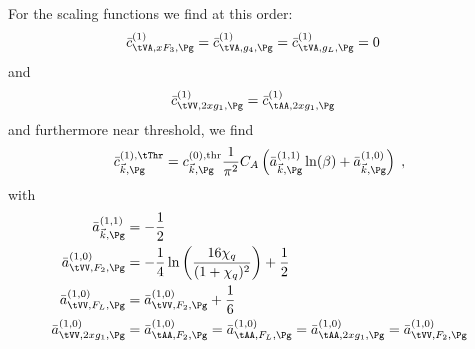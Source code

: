 For the scaling functions we find at this order:
\begin{align}
\bar c_{\tVA,xF_3,\Pg}^{(1)} &= \bar c_{\tVA,g_4,\Pg}^{(1)} = \bar c_{\tVA,g_L,\Pg}^{(1)} = 0
\end{align}
and 
\begin{align}
\bar c_{\tVV,2xg_1,\Pg}^{(1)} &= \bar c_{\tAA,2xg_1,\Pg}^{(1)}
\end{align}
and furthermore  near threshold, we find
\begin{equation}
\bar c_{\vec k,\Pg}^{(1),\tThr} = c_{\vec k,\Pg}^{(0),\text{thr}} \frac{1}{\pi^2}
     C_A\left(\bar a_{\vec k,\Pg}^{(1,1)}\ln(\beta) + \bar a_{\vec k,\Pg}^{(1,0)}\right)\;,
\end{equation} 
with
\begin{align}
\bar a^{(1,1)}_{\vec k,\Pg} &= -\frac 1 2\\
\bar a^{(1,0)}_{\tVV,F_2,\Pg} &= -\frac 1 4 \ln\left(\frac{16\chi_q}{(1+\chi_q)^2}\right)+\frac 1 2\\
\bar a^{(1,0)}_{\tVV,F_L,\Pg} &= \bar a^{(1,0)}_{\tVV,F_2,\Pg} + \frac 1 6\\
\bar a^{(1,0)}_{\tVV,2xg_1,\Pg} &= \bar a^{(1,0)}_{\tAA,F_2,\Pg} = \bar a^{(1,0)}_{\tAA,F_L,\Pg} = \bar a^{(1,0)}_{\tAA,2xg_1,\Pg}= \bar a^{(1,0)}_{\tVV,F_2,\Pg}
\end{align}

